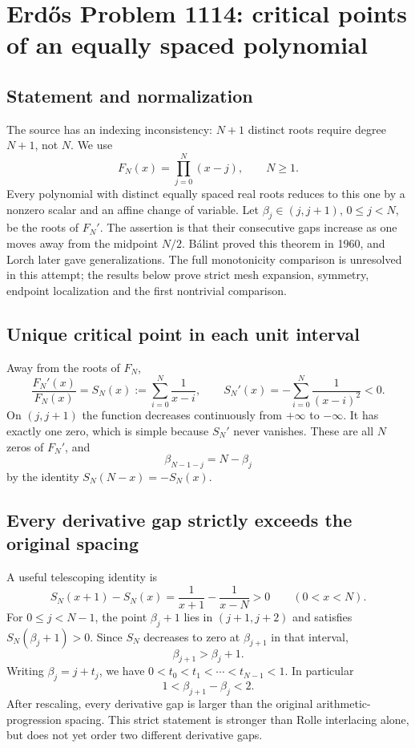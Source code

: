 \section*{Erd\H{o}s Problem 1114: critical points of an equally spaced polynomial}
\subsection*{Statement and normalization}
The source has an indexing inconsistency: $N+1$ distinct roots require degree $N+1$, not $N$. We use
\[
 F_N(x)=\prod_{j=0}^{N}(x-j),\qquad N\ge1.
\]
Every polynomial with distinct equally spaced real roots reduces to this one by a nonzero scalar and an affine change of variable. Let $\beta_j\in(j,j+1)$, $0\le j<N$, be the roots of $F_N'$. The assertion is that their consecutive gaps increase as one moves away from the midpoint $N/2$.
B\'alint proved this theorem in 1960, and Lorch later gave generalizations. The full monotonicity comparison is unresolved in this attempt; the results below prove strict mesh expansion, symmetry, endpoint localization and the first nontrivial comparison.

\subsection*{Unique critical point in each unit interval}
Away from the roots of $F_N$,
\[
 \frac{F_N'(x)}{F_N(x)}=S_N(x):=\sum_{i=0}^N\frac1{x-i},\qquad
 S_N'(x)=-\sum_{i=0}^N\frac1{(x-i)^2}<0.
\]
On $(j,j+1)$ the function decreases continuously from $+\infty$ to $-\infty$. It has exactly one zero, which is simple because $S_N'$ never vanishes. These are all $N$ zeros of $F_N'$, and
\[
 \beta_{N-1-j}=N-\beta_j
\]
by the identity $S_N(N-x)=-S_N(x)$.

\subsection*{Every derivative gap strictly exceeds the original spacing}
A useful telescoping identity is
\[
 S_N(x+1)-S_N(x)=\frac1{x+1}-\frac1{x-N}>0
 \qquad(0<x<N).
\]
For $0\le j<N-1$, the point $\beta_j+1$ lies in $(j+1,j+2)$ and satisfies $S_N(\beta_j+1)>0$. Since $S_N$ decreases to zero at $\beta_{j+1}$ in that interval,
\[
 \beta_{j+1}>\beta_j+1.
 \tag{1}
\]
Writing $\beta_j=j+t_j$, we have $0<t_0<t_1<\cdots<t_{N-1}<1$. In particular
\[
 1<\beta_{j+1}-\beta_j<2.
\]
After rescaling, every derivative gap is larger than the original arithmetic-progression spacing. This strict statement is stronger than Rolle interlacing alone, but does not yet order two different derivative gaps.

